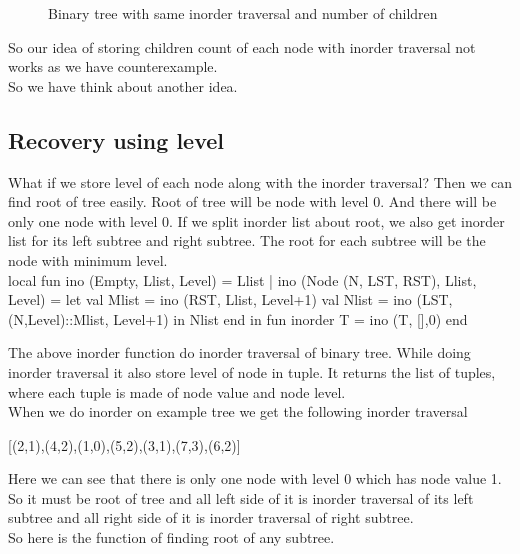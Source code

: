 \documentclass[10pt,a4paper]{article}%
\begin{document}
\begin{figure}[h!]
\begin{center} 
\end{center}
\caption{Binary tree with same inorder traversal and number of children}
\end{figure}
So our idea of storing children count of each node with inorder traversal not works as we have counterexample. \\
So we have think about another idea. 
\subsection{Recovery using level}
What if we store level of each node along with the inorder traversal?
Then we can find root of tree easily. Root of tree will be node with level 0. And there will be only one node with level 0. If we split inorder list about root, we also get inorder list for its left subtree and right subtree. The root for each subtree will be the node with minimum level.\\

\nwenddocs{}\endmoddef\nwstartdeflinemarkup{}\nwenddeflinemarkup
local
        fun ino (Empty, Llist, Level) = Llist
                | ino (Node (N, LST, RST), Llist, Level) =
                        let val Mlist = ino (RST, Llist, Level+1)
                                val Nlist = ino (LST, (N,Level)::Mlist, Level+1)
                        in Nlist
                        end
in
        fun inorder T = ino (T, [],0)
end
\nwendcode{}\nwdocspar

The above inorder function do inorder traversal of binary tree. While doing inorder traversal it also store level of node in tuple. It returns the list of tuples, where each tuple is made of node value and node level. \\
When we do inorder on example tree we get the following inorder traversal
\begin{center}
[(2,1),(4,2),(1,0),(5,2),(3,1),(7,3),(6,2)]
\end{center}
Here we can see that there is only one node with level 0 which has node value 1. So it must be root of tree and all left side of it is inorder traversal of its left subtree and all right side of it is inorder traversal of right subtree. \\
So here is the function of finding root of any subtree. \\
\end{document}

